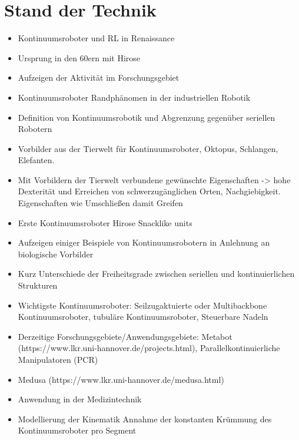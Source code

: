 \chapter{Stand der Technik}


\begin{itemize}

\item Kontinuumsroboter und RL in Renaissance
\item Ursprung in den 60ern mit Hirose
\item Aufzeigen der Aktivität im Forschungsgebiet
\item Kontinuumsroboter Randphänomen in der industriellen Robotik
\item Definition von Kontinuumsrobotik und Abgrenzung gegenüber seriellen Robotern
\item Vorbilder aus der Tierwelt für Kontinuumsroboter, Oktopus, Schlangen, Elefanten.
\item Mit Vorbildern der Tierwelt verbundene gewünschte Eigenschaften -> hohe Dexterität und Erreichen von schwerzugänglichen Orten, Nachgiebigkeit. Eigenschaften wie Umschließen damit Greifen
\item Erste Kontinuumsroboter Hirose Snacklike units
\item Aufzeigen einiger Beispiele von Kontinuumsrobotern in Anlehnung an biologische Vorbilder
\item Kurz Unterschiede der Freiheitsgrade zwischen seriellen und kontinuierlichen Strukturen
\item Wichtigste Kontinuumsroboter: Seilzugaktuierte oder Multibackbone Kontinuumsroboter, tubuläre Kontinuumsroboter, Steuerbare Nadeln

\item Derzeitige Forschungsgebiete/Anwendungsgebiete: Metabot (https://www.lkr.uni-hannover.de/projects.html), Parallelkontinuierliche Manipulatoren (PCR)
\item Medusa (https://www.lkr.uni-hannover.de/medusa.html)
\item Anwendung in der Medizintechnik

\item Modellierung der Kinematik Annahme der konstanten Krümmung des Kontinuumsroboter pro Segment


\end{itemize}
